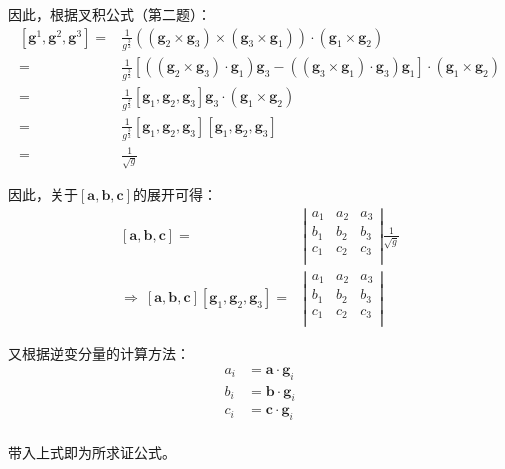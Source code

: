 \documentclass[UTF8,zihao=5]{ctexart}
\newcommand{\bm}[1]{{\mathbf{#1}}}
\begin{document}
因此，根据叉积公式（第二题）：
\begin{equation*}
    \begin{aligned}
        [\bm{g}^1, \bm{g}^2, \bm{g}^3]=&
        \frac{1}{g^{\frac{3}{2}}}
        \left(
            (\bm{g}_2\times\bm{g}_3)\times
            (\bm{g}_3\times\bm{g}_1)
        \right)\cdot
        (\bm{g}_1\times\bm{g}_2)\\
        =&
        \frac{1}{g^{\frac{3}{2}}}
        \left[
            \left(
                (\bm{g}_2\times\bm{g}_3)\cdot\bm{g}_1
            \right)\bm{g}_3-
            \left(
                (\bm{g}_3\times\bm{g}_1)\cdot\bm{g}_3
            \right)\bm{g}_1
        \right]\cdot
        (\bm{g}_1\times\bm{g}_2)\\
        =&
        \frac{1}{g^{\frac{3}{2}}}
            [\bm{g}_1,\bm{g}_2,\bm{g}_3]\bm{g}_3\cdot
        (\bm{g}_1\times\bm{g}_2)\\
        =&
        \frac{1}{g^{\frac{3}{2}}}
            [\bm{g}_1,\bm{g}_2,\bm{g}_3][\bm{g}_1,\bm{g}_2,\bm{g}_3]\\
        =&
        \frac{1}{\sqrt{g}}
    \end{aligned}
\end{equation*}

因此，关于$[\bm{a},\bm{b},\bm{c}]$的展开可得：
\begin{equation*}
    \begin{aligned}
        [\bm{a},\bm{b},\bm{c}]
        =&\left|
            \begin{matrix}
                a_1 &a_2 &a_3\\
                b_1 &b_2 &b_3\\
                c_1 &c_2 &c_3\\
            \end{matrix}
        \right|\frac{1}{\sqrt{g}}\\
        \Rightarrow\ 
        [\bm{a},\bm{b},\bm{c}][\bm{g}_1,\bm{g}_2,\bm{g}_3]
        =&\left|
            \begin{matrix}
                a_1 &a_2 &a_3\\
                b_1 &b_2 &b_3\\
                c_1 &c_2 &c_3\\
            \end{matrix}
        \right|
    \end{aligned}
\end{equation*}

又根据逆变分量的计算方法：
\begin{equation*}
    \begin{aligned}
        a_i&=\bm{a}\cdot\bm{g}_i\\
        b_i&=\bm{b}\cdot\bm{g}_i\\
        c_i&=\bm{c}\cdot\bm{g}_i\\
    \end{aligned}
\end{equation*}

带入上式即为所求证公式。
\end{document}

